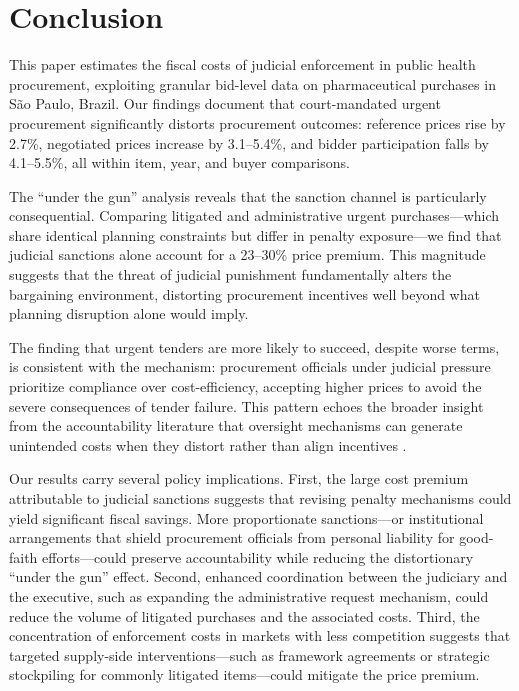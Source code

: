 \section{Conclusion}
\label{sec:conclusion}

This paper estimates the fiscal costs of judicial enforcement in public health procurement, exploiting granular bid-level data on pharmaceutical purchases in S\~ao Paulo, Brazil. Our findings document that court-mandated urgent procurement significantly distorts procurement outcomes: reference prices rise by 2.7\%, negotiated prices increase by 3.1--5.4\%, and bidder participation falls by 4.1--5.5\%, all within item, year, and buyer comparisons.

The ``under the gun'' analysis reveals that the sanction channel is particularly consequential. Comparing litigated and administrative urgent purchases---which share identical planning constraints but differ in penalty exposure---we find that judicial sanctions alone account for a 23--30\% price premium. This magnitude suggests that the threat of judicial punishment fundamentally alters the bargaining environment, distorting procurement incentives well beyond what planning disruption alone would imply.

The finding that urgent tenders are more likely to succeed, despite worse terms, is consistent with the mechanism: procurement officials under judicial pressure prioritize compliance over cost-efficiency, accepting higher prices to avoid the severe consequences of tender failure. This pattern echoes the broader insight from the accountability literature that oversight mechanisms can generate unintended costs when they distort rather than align incentives \citep{rasul2018management, duflo2018obligations}.

Our results carry several policy implications. First, the large cost premium attributable to judicial sanctions suggests that revising penalty mechanisms could yield significant fiscal savings. More proportionate sanctions---or institutional arrangements that shield procurement officials from personal liability for good-faith efforts---could preserve accountability while reducing the distortionary ``under the gun'' effect. Second, enhanced coordination between the judiciary and the executive, such as expanding the administrative request mechanism, could reduce the volume of litigated purchases and the associated costs. Third, the concentration of enforcement costs in markets with less competition suggests that targeted supply-side interventions---such as framework agreements or strategic stockpiling for commonly litigated items---could mitigate the price premium.

